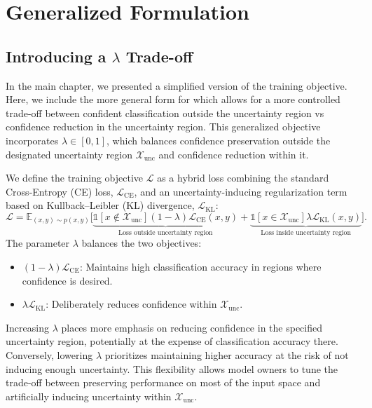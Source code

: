 \section{Generalized \attack Formulation}

\subsection{Introducing a $\lambda$ Trade-off}
\label{appendix:generalized-attack-loss}

In the main chapter, we presented a simplified version of the \attack training objective. Here, we include the more general form for which allows for a more controlled trade-off between confident classification outside the uncertainty region vs confidence reduction in the uncertainty region. This generalized objective incorporates \(\lambda \in [0,1]\), which balances confidence preservation outside the designated uncertainty region \(\mathcal{X}_\text{unc}\) and confidence reduction within it.


We define the training objective \(\mathcal{L}\) as a hybrid loss combining the standard Cross-Entropy (CE) loss, \(\mathcal{L}_\text{CE}\), and an uncertainty-inducing regularization term based on Kullback--Leibler (KL) divergence, \(\mathcal{L}_\text{KL}\):
\begin{equation}
\label{eq:mirage_ext}
        \mathcal{L} = \mathbb{E}_{(x,y) \sim p(x, y)} \bigg[ \underbrace{\mathds{1}\left[x \not\in \mathcal{X}_\text{unc}\right] (1-\lambda) \mathcal{L}_\text{CE}(x, y)}_\text{Loss outside uncertainty region} + \underbrace{\mathds{1}\left[x \in \mathcal{X}_\text{unc}\right] \lambda \mathcal{L}_\text{KL}(x, y)}_\text{Loss inside uncertainty region} \bigg].
\end{equation}
The parameter \(\lambda\) balances the two objectives:
\begin{itemize}
    \item \((1 - \lambda)\mathcal{L}_\text{CE}\): Maintains high classification accuracy in regions where confidence is desired.
    \item \(\lambda \mathcal{L}_\text{KL}\): Deliberately reduces confidence within \(\mathcal{X}_\text{unc}\).
\end{itemize}

Increasing \(\lambda\) places more emphasis on reducing confidence in the specified uncertainty region, potentially at the expense of classification accuracy there. Conversely, lowering \(\lambda\) prioritizes maintaining higher accuracy at the risk of not inducing enough uncertainty. This flexibility allows model owners to tune the trade-off between preserving performance on most of the input space and artificially inducing uncertainty within \(\mathcal{X}_\text{unc}\).

